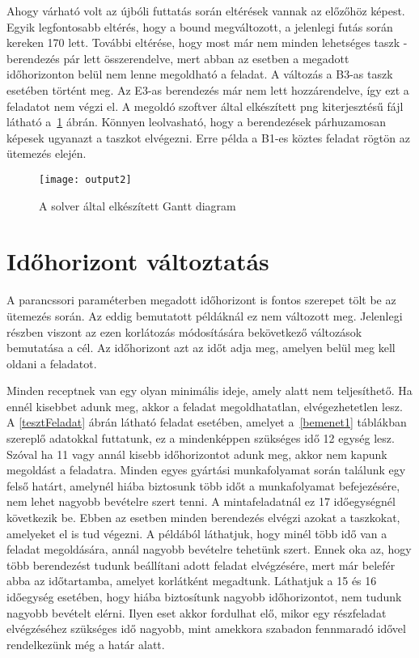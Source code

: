 Ahogy várható volt az újbóli futtatás során eltérések vannak az előzőhöz képest. Egyik legfontosabb eltérés, hogy a bound megváltozott, a jelenlegi futás során kereken 170 lett. További eltérése, hogy most már nem minden lehetséges taszk - berendezés pár lett összerendelve, mert abban az esetben a megadott időhorizonton belül nem lenne megoldható a feladat. A változás a B3-as taszk esetében történt meg. Az E3-as berendezés már nem lett hozzárendelve, így ezt a feladatot nem végzi el. A megoldó szoftver által elkészített png kiterjesztésű fájl látható a~\ref{output2} ábrán. Könnyen leolvasható, hogy a berendezések párhuzamosan képesek ugyanazt a taszkot elvégezni. Erre példa a B1-es köztes feladat rögtön az ütemezés elején. 

\begin{figure}[H]
\begin{center}
\texttt{[image: output2]}
\caption{A solver által elkészített Gantt diagram}
\label{output2}
\end{center}
\end{figure}

\section{Időhorizont változtatás}
A parancssori paraméterben megadott időhorizont is fontos szerepet tölt be az ütemezés során. Az eddig bemutatott példáknál ez nem változott meg. Jelenlegi részben viszont az ezen korlátozás módosítására bekövetkező változások bemutatása a cél. Az időhorizont azt az időt adja meg, amelyen belül meg kell oldani a feladatot.

Minden receptnek van egy olyan minimális ideje, amely alatt nem teljesíthető. Ha ennél kisebbet adunk meg, akkor a feladat megoldhatatlan, elvégezhetetlen lesz. A \ref{tesztFeladat} ábrán látható feladat esetében, amelyet a~\ref{bemenet1} táblákban szereplő adatokkal futtatunk, ez a mindenképpen szükséges idő 12 egység lesz. Szóval ha 11 vagy annál kisebb időhorizontot adunk meg, akkor nem kapunk megoldást a feladatra. Minden egyes gyártási munkafolyamat során találunk egy felső határt, amelynél hiába biztosunk több időt a munkafolyamat befejezésére, nem lehet nagyobb bevételre szert tenni. A mintafeladatnál ez 17 időegységnél következik be. Ebben az esetben minden berendezés elvégzi azokat a taszkokat, amelyeket el is tud végezni. A példából láthatjuk, hogy minél több idő van a feladat megoldására, annál nagyobb bevételre tehetünk szert. Ennek oka az, hogy több berendezést tudunk beállítani adott feladat elvégzésére, mert már belefér abba az időtartamba, amelyet korlátként megadtunk. Láthatjuk a 15 és 16 időegység esetében, hogy hiába biztosítunk nagyobb időhorizontot, nem tudunk nagyobb bevételt elérni. Ilyen eset akkor fordulhat elő, mikor egy részfeladat elvégzéséhez szükséges idő nagyobb, mint amekkora szabadon fennmaradó idővel rendelkezünk még a határ alatt.  

